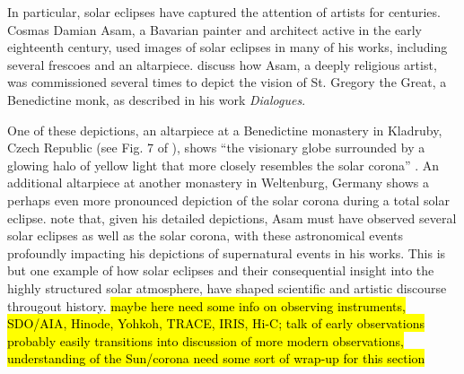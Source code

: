 %
\par In particular, solar eclipses have captured the attention of artists for centuries. Cosmas Damian Asam, a Bavarian painter and architect active in the early eighteenth century, used images of solar eclipses in many of his works, including several frescoes and an altarpiece. \citet{olson_st._2007} discuss how Asam, a deeply religious artist, was commissioned several times to depict the vision of St. Gregory the Great, a Benedictine monk, as described in his work \textit{Dialogues}. 
%
\par One of these depictions, an altarpiece at a Benedictine monastery in Kladruby, Czech Republic (see Fig. 7 of \citet{olson_st._2007}), shows ``the visionary globe surrounded by a glowing halo of yellow light that more closely resembles the solar corona'' \citep{olson_st._2007}. An additional altarpiece at another monastery in Weltenburg, Germany shows a perhaps even more pronounced depiction of the solar corona during a total solar eclipse. \citet{olson_st._2007} note that, given his detailed depictions, Asam must have observed several solar eclipses as well as the solar corona, with these astronomical events profoundly impacting his depictions of supernatural events in his works. This is but one example of how solar eclipses and their consequential insight into the highly structured solar atmosphere, have shaped scientific and artistic discourse througout history.
%
\hl{maybe here need some info on observing instruments, SDO/AIA, Hinode, Yohkoh, TRACE, IRIS, Hi-C; talk of early observations probably easily transitions into discussion of more modern observations, understanding of the Sun/corona need some sort of wrap-up for this section}
